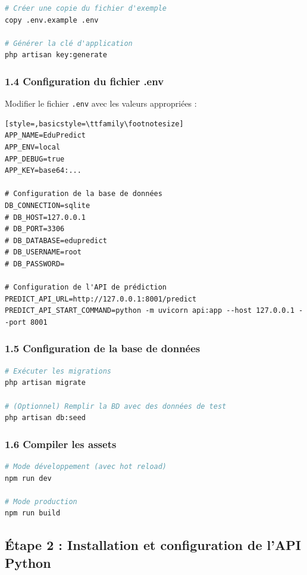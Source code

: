 \documentclass[12pt,a4paper]{article}
\begin{document}
\begin{lstlisting}[language=bash]
# Créer une copie du fichier d'exemple
copy .env.example .env

# Générer la clé d'application
php artisan key:generate
\end{lstlisting}

\subsubsection{1.4 Configuration du fichier .env}

Modifier le fichier \texttt{.env} avec les valeurs appropriées :

\begin{lstlisting}[style=,basicstyle=\ttfamily\footnotesize]
APP_NAME=EduPredict
APP_ENV=local
APP_DEBUG=true
APP_KEY=base64:...

# Configuration de la base de données
DB_CONNECTION=sqlite
# DB_HOST=127.0.0.1
# DB_PORT=3306
# DB_DATABASE=edupredict
# DB_USERNAME=root
# DB_PASSWORD=

# Configuration de l'API de prédiction
PREDICT_API_URL=http://127.0.0.1:8001/predict
PREDICT_API_START_COMMAND=python -m uvicorn api:app --host 127.0.0.1 --port 8001
\end{lstlisting}

\subsubsection{1.5 Configuration de la base de données}

\begin{lstlisting}[language=bash]
# Exécuter les migrations
php artisan migrate

# (Optionnel) Remplir la BD avec des données de test
php artisan db:seed
\end{lstlisting}

\subsubsection{1.6 Compiler les assets}

\begin{lstlisting}[language=bash]
# Mode développement (avec hot reload)
npm run dev

# Mode production
npm run build
\end{lstlisting}

\subsection{Étape 2 : Installation et configuration de l'API Python}
\end{document}
